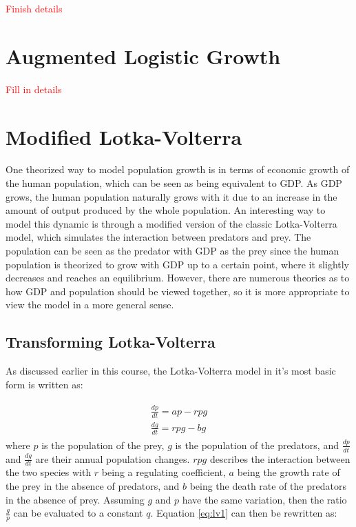 \documentclass[a4paper]{article}
\newcommand{\todo}[1]{{\Large\textcolor{red}{#1}}}
\begin{document}
\todo{Finish details}

\section{Augmented Logistic Growth}

\todo{Fill in details}

\section{Modified Lotka-Volterra}

One theorized way to model population growth is in terms of economic growth of the human population, which can be seen as being equivalent to GDP. As GDP grows, the human population naturally grows with it due to an increase in the amount of output produced by the whole population. An interesting way to model this dynamic is through a modified version of the classic Lotka-Volterra model, which simulates the interaction between predators and prey. The population can be seen as the predator with GDP as the prey since the human population is theorized to grow with GDP up to a certain point, where it slightly decreases and reaches an equilibrium. However, there are numerous theories as to how GDP and population should be viewed together, so it is more appropriate to view the model in a more general sense. 

\subsection{Transforming Lotka-Volterra}

As discussed earlier in this course, the Lotka-Volterra model in it's most basic form is written as:

\begin{align}
\begin{split}
\label{eq:lv1}
	\frac{dp}{dt} = ap - rpg \\
	\frac{dg}{dt} = rpg - bg
\end{split}
\end{align}
where $p$ is the population of the prey, $g$ is the population of the predators, and $\frac{dp}{dt}$ and $\frac{dg}{dt}$ are their annual population changes. $rpg$ describes the interaction between the two species with $r$ being a regulating coefficient, $a$ being the growth rate of the prey in the absence of predators, and $b$ being the death rate of the predators in the absence of prey. Assuming $g$ and $p$ have the same variation, then the ratio $\frac{g}{p}$ can be evaluated to a constant ${q}$. Equation \ref{eq:lv1} can then be rewritten as:
\end{document}
